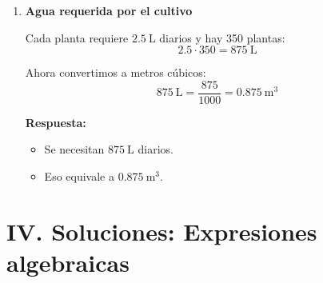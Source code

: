 \documentclass[12pt]{article}
\begin{document}
\begin{enumerate}[itemsep=0.7cm]
\begin{itemize}
			\item \textbf{En m/s}
			
			Convertimos:
			\[
			15\ \text{km}=15000\ \text{m},
			\qquad
			30\ \text{min}=1800\ \text{s}
			\]
			\[
			v=\frac{15000}{1800}=\frac{25}{3}\approx 8.33\ \text{m/s}
			\]
		\end{itemize}
		
		\textbf{Respuesta:} $30\ \text{km/h}$ y aproximadamente $8.33\ \text{m/s}$.
		
		\item \textbf{Agua requerida por el cultivo}
		
		Cada planta requiere $2.5\ \text{L}$ diarios y hay 350 plantas:
		\[
		2.5\cdot350=875\ \text{L}
		\]
		
		Ahora convertimos a metros cúbicos:
		\[
		875\ \text{L}=\frac{875}{1000}=0.875\ \text{m}^3
		\]
		
		\textbf{Respuesta:}
		\begin{itemize}
			\item Se necesitan $875\ \text{L}$ diarios.
			\item Eso equivale a $0.875\ \text{m}^3$.
		\end{itemize}
	\end{enumerate}
	
	\section*{IV. Soluciones: Expresiones algebraicas}
	
\end{document}
